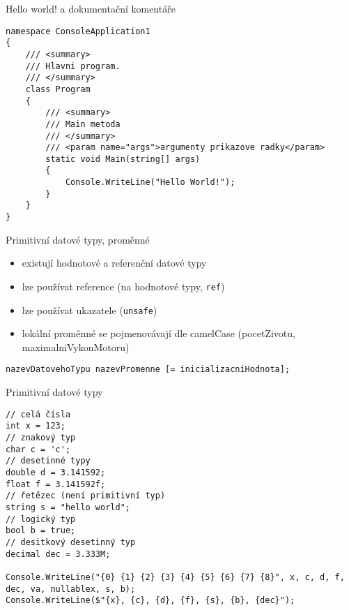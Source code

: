 \begin{frame}[fragile]
\begin{exampleblock}{Hello world! a dokumentační komentáře}
\begin{lstlisting}[basicstyle=\small]
namespace ConsoleApplication1
{
    /// <summary>
    /// Hlavni program.
    /// </summary>
    class Program
    {
        /// <summary>
        /// Main metoda
        /// </summary>
        /// <param name="args">argumenty prikazove radky</param>
        static void Main(string[] args)
        {
            Console.WriteLine("Hello World!");
        }
    }
}
\end{lstlisting}
\end{exampleblock}
\end{frame}





\begin{frame}[fragile]
\begin{block}{Primitivní datové typy, proměnné}
\begin{itemize}
\item existují hodnotové a referenční datové typy
\item lze používat reference (na hodnotové typy, \lstinline|ref|)
\item lze používat ukazatele (\lstinline|unsafe|)
\item lokální proměnné se pojmenovávají dle camelCase (pocetZivotu, maximalniVykonMotoru)
\end{itemize}
\end{block}

\begin{noteblock}{}
\begin{lstlisting}
nazevDatovehoTypu nazevPromenne [= inicializacniHodnota];
\end{lstlisting}
\end{noteblock}
\end{frame}




\begin{frame}[fragile]
\begin{exampleblock}{Primitivní datové typy}
\begin{lstlisting}
// celá čísla
int x = 123;
// znakový typ
char c = 'c';
// desetinné typy
double d = 3.141592;
float f = 3.141592f;
// řetězec (není primitivní typ)
string s = "hello world";
// logický typ
bool b = true;
// desitkový desetinný typ
decimal dec = 3.333M;
           
Console.WriteLine("{0} {1} {2} {3} {4} {5} {6} {7} {8}", x, c, d, f, dec, va, nullablex, s, b);
Console.WriteLine($"{x}, {c}, {d}, {f}, {s}, {b}, {dec}");
\end{lstlisting}
\end{exampleblock}
\end{frame}

